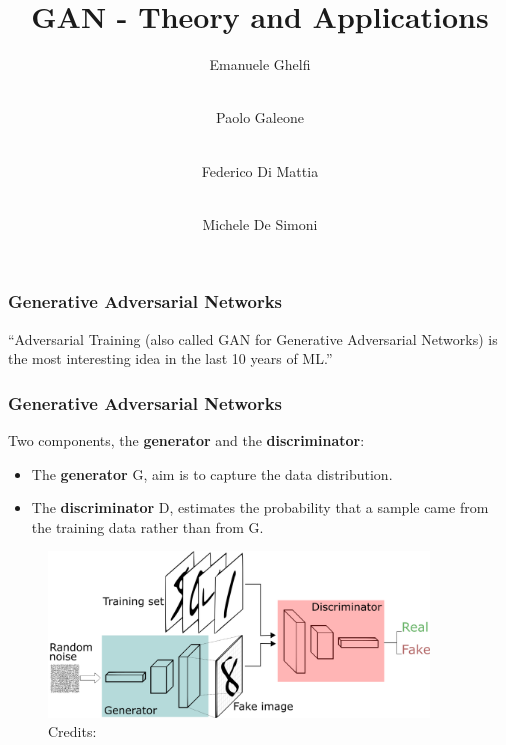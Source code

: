 \documentclass{beamer}
\title[GAN]
{GAN - Theory and Applications}
\author
{Emanuele Ghelfi  \and \\ Paolo Galeone \and \\ Federico Di Mattia \and \\ Michele De Simoni}
\begin{document}
 
{
  \begin{frame}
    \titlepage
  \end{frame}
}


\begin{frame}
\end{frame}

 
\begin{frame}
	\frametitle{Generative Adversarial Networks}
	
	\begin{block}{}
		{\large ``Adversarial Training (also called GAN for Generative Adversarial Networks) is the most interesting idea in the last 10 years of ML.''}
		\vskip5mm
		\hspace*{}
	\end{block}

\end{frame}

\begin{frame}
	\frametitle{Generative Adversarial Networks}
	
	Two components, the \textbf{generator} and the \textbf{discriminator}:
	\begin{itemize}
			\item The \textbf{generator} G, aim is to capture the data distribution.
			\item The \textbf{discriminator} D, estimates the probability that a sample came from the training data rather than from G.
	\end{itemize}
	
	\begin{figure}
		\includegraphics[width=0.9\textwidth]{images/GANs.png}
		\caption{Credits: \cite{silvaIntuitiveIntroductionGenerative2018} }
	\end{figure}

\end{frame}
\end{document}
